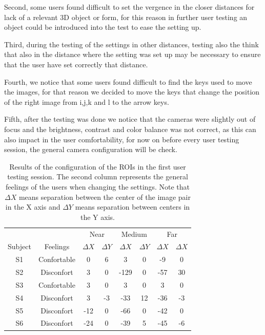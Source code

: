 \documentclass[10pt,a4paper,twocolumn,twoside]{article}
\begin{document}
	Second, some users found difficult to set the vergence in the closer distances for lack of a relevant 3D object or form, for this reason in further user testing an object could be introduced into the test to ease the setting up. 
	
	Third, during the testing of the settings in other distances, testing also the think that  also in the distance where the setting was set up may be necessary to ensure that the user have set correctly that distance.
	
	Fourth, we notice that some users found difficult to find the keys used to move the images, for that reason we decided to move the keys that change the position of the right image from i,j,k and l to the arrow keys. 
	
	Fifth, after the testing was done we notice that the cameras were slightly out of focus and the brightness, contrast and color balance was not correct, as this can also impact in the user comfortability, for now on before every user testing session, the general camera configuration will be check.
	
	
	\begin{table}
		\begin{center}
			\begin{tabular}{cccccccc}
				\toprule
				& & \multicolumn{2}{c}{Near} & \multicolumn{2}{c}{Medium} & \multicolumn{2}{c}{Far} \\ 
				Subject &Feelings & $\Delta X$ & $\Delta Y$ & $\Delta X$ & $\Delta Y$ & $\Delta X$ & $\Delta X$ \\ 
				\midrule
				S1&Confortable & 0 & 6 & 3 & 0 & -9 & 0 \\ 
				\midrule 
				S2&Disconfort & 3 & 0 & -129 & 0 & -57 & 30 \\ 
				\midrule
				S3&Confortable & 3 & 0 & 3 & 0 & 3 & 0 \\ 
				\midrule 
				S4&Disconfort & 3 & -3 & -33 & 12 & -36 & -3 \\ 
				\midrule
				S5&Disconfort & -12 & 0 & -66 & 0 & -42 & 0 \\ 
				\midrule
				S6&Disconfort & -24 & 0 & -39 & 5 & -45 & -6 \\ 
				\bottomrule
			\end{tabular} 
			\caption{Results of the configuration of the ROIs in the first user testing session. The second column represents the general feelings of the users when changing the settings. Note that $\Delta X$ means separation between the center of the image pair in the X axis and $\Delta Y$ means separation between centers in the Y axis.}
			\label{tab:firstUserTestResults}
		\end{center}
	\end{table}
	
\end{document}
